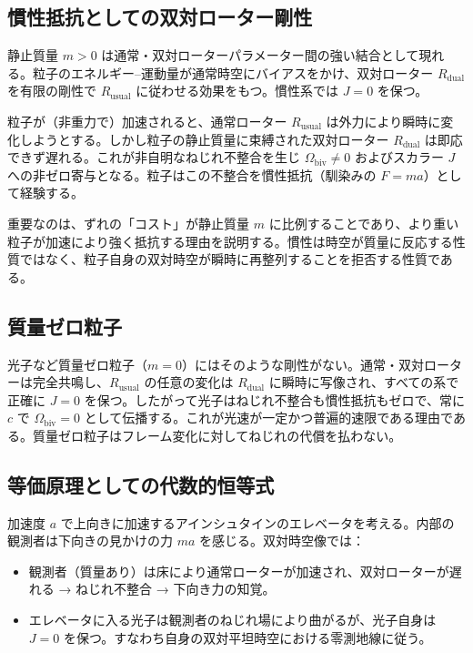 \documentclass[dvipdfmx,a4paper]{article}
\begin{document}
\subsection{慣性抵抗としての双対ローター剛性}

静止質量 $m > 0$ は通常・双対ローターパラメーター間の強い結合として現れる。粒子のエネルギー--運動量が通常時空にバイアスをかけ、双対ローター $R_\text{dual}$ を有限の剛性で $R_\text{usual}$ に従わせる効果をもつ。慣性系では $J = 0$ を保つ。

粒子が（非重力で）加速されると、通常ローター $R_\text{usual}$ は外力により瞬時に変化しようとする。しかし粒子の静止質量に束縛された双対ローター $R_\text{dual}$ は即応できず遅れる。これが非自明なねじれ不整合を生じ $\Omega_\text{biv} \neq 0$ およびスカラー $J$ への非ゼロ寄与となる。粒子はこの不整合を慣性抵抗（馴染みの $F = ma$）として経験する。

重要なのは、ずれの「コスト」が静止質量 $m$ に比例することであり、より重い粒子が加速により強く抵抗する理由を説明する。慣性は時空が質量に反応する性質ではなく、粒子自身の双対時空が瞬時に再整列することを拒否する性質である。

\subsection{質量ゼロ粒子}

光子など質量ゼロ粒子（$m = 0$）にはそのような剛性がない。通常・双対ローターは完全共鳴し、$R_\text{usual}$ の任意の変化は $R_\text{dual}$ に瞬時に写像され、すべての系で正確に $J = 0$ を保つ。したがって光子はねじれ不整合も慣性抵抗もゼロで、常に $c$ で $\Omega_\text{biv} = 0$ として伝播する。これが光速が一定かつ普遍的速限である理由である。質量ゼロ粒子はフレーム変化に対してねじれの代償を払わない。

\subsection{等価原理としての代数的恒等式}

加速度 $a$ で上向きに加速するアインシュタインのエレベータを考える。内部の観測者は下向きの見かけの力 $ma$ を感じる。双対時空像では：

\begin{itemize}
\item 観測者（質量あり）は床により通常ローターが加速され、双対ローターが遅れる → ねじれ不整合 → 下向き力の知覚。
\item エレベータに入る光子は観測者のねじれ場により曲がるが、光子自身は $J = 0$ を保つ。すなわち自身の双対平坦時空における零測地線に従う。
\end{itemize}
\end{document}
